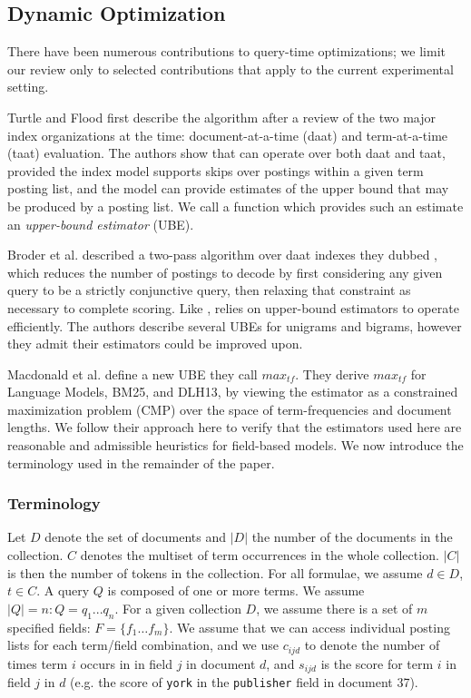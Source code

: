 \documentclass{sig-alternate}
\newcommand{\method}[1]{{\sc{#1}}}
\begin{document}
\subsection{Dynamic Optimization}
There have been numerous contributions to query-time optimizations; we limit our review only to selected contributions that apply to the current experimental setting.

Turtle and Flood  \cite{turtle-ipm-1995} first describe the \method{maxscore} algorithm after a review of the two major index organizations at the time: document-at-a-time (daat) and term-at-a-time (taat) evaluation. The authors show that \method{maxscore} can operate over both daat and taat, provided the index model supports skips over postings within a given term posting list, and the model can provide estimates of the upper bound that may be produced by a posting list. We call a function which provides such an estimate an \textit{upper-bound estimator} (UBE). 

Broder et al. \cite{broder-cikm-2003} described a two-pass algorithm over daat indexes they dubbed \method{wand}, which reduces the number of postings to decode by
first considering any given query to be a strictly conjunctive query, then relaxing that constraint as necessary to complete scoring. Like \method{maxscore}, \method{wand} relies on upper-bound estimators to operate efficiently. The authors describe several UBEs for unigrams and bigrams, however they admit their estimators could be improved upon.

Macdonald et al. \cite{Macdonald-tois-2011} define a new UBE they call $max_{tf}$. They derive $max_{tf}$ for Language Models, BM25, and DLH13, by viewing the estimator as a constrained maximization problem (CMP) over the space of term-frequencies and document lengths. We follow their approach here to verify that the estimators used here are reasonable and admissible heuristics for field-based models. We now introduce the terminology used in the remainder of the paper. 
\subsubsection{Terminology} \label{sec:term}
Let $D$ denote the set of documents and $|D|$ the number of the documents in the collection. $C$ denotes the multiset of term occurrences in the whole collection. $|C|$ is then the number of tokens in the collection. For all formulae, we assume $d \in D$, $t \in C$. A query $Q$ is composed of one or more terms. We assume $|Q| = n: Q = q_{1}...q_{n}$. For a given collection $D$, we assume there is a set of $m$ specified fields: $F = \lbrace f_{1}\dots f_{m} \rbrace$. We assume that we can access individual posting lists for each term/field combination, and we use $c_{ijd}$ to denote the number of times term $i$ occurs in in field $j$ in document $d$, and $s_{ijd}$ is the score for term $i$ in field $j$ in $d$ (e.g. the score of \verb|york| in the \verb|publisher| field in document 37). 
\end{document}
